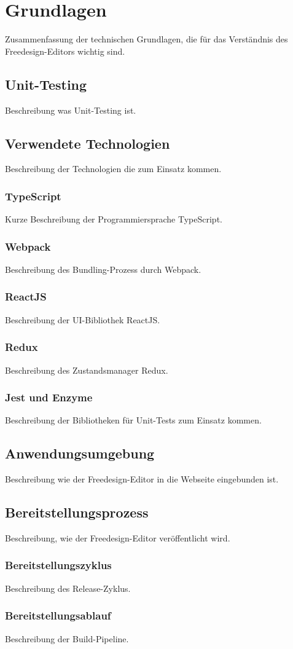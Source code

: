 \chapter{Grundlagen}
Zusammenfassung der technischen Grundlagen, die für das Verständnis des Freedesign-Editors wichtig sind.

\section{Unit-Testing}
Beschreibung was Unit-Testing ist.

\section{Verwendete Technologien}
Beschreibung der Technologien die zum Einsatz kommen.

\subsection{TypeScript}
Kurze Beschreibung der Programmiersprache TypeScript.

\subsection{Webpack}
Beschreibung des Bundling-Prozess durch Webpack.

\subsection{ReactJS}
Beschreibung der UI-Bibliothek ReactJS.

\subsection{Redux}
Beschreibung des Zustandsmanager Redux.

\subsection{Jest und Enzyme}
Beschreibung der Bibliotheken für Unit-Tests zum Einsatz kommen.

\section{Anwendungsumgebung}
Beschreibung wie der Freedesign-Editor in die Webseite eingebunden ist.

\section{Bereitstellungsprozess}
Beschreibung, wie der Freedesign-Editor veröffentlicht wird.

\subsection{Bereitstellungszyklus}
Beschreibung des Release-Zyklus.

\subsection{Bereitstellungsablauf}
Beschreibung der Build-Pipeline.
